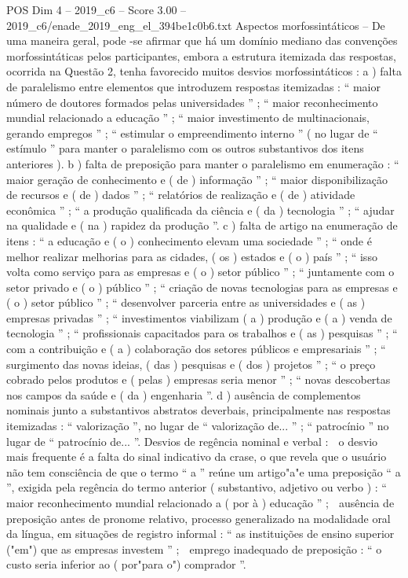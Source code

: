 \begin{textsample}{POS Dim 4 – 2019\_c6 – Score 3.00 – 2019\_c6/enade\_2019\_eng\_el\_394be1c0b6.txt}
Aspectos morfossintáticos – De uma maneira geral, pode -se afirmar que há um domínio mediano das convenções morfossintáticas pelos participantes, embora a estrutura itemizada das respostas, ocorrida na Questão 2, tenha favorecido muitos desvios morfossintáticos : a ) falta de paralelismo entre elementos que introduzem respostas itemizadas : “ maior número de doutores formados pelas universidades ” ; “ maior reconhecimento mundial relacionado a educação ” ; “ maior investimento de multinacionais, gerando empregos ” ; “ estimular o empreendimento interno ” ( no lugar de “ estímulo ” para manter o paralelismo com os outros substantivos dos itens anteriores ). b ) falta de preposição para manter o paralelismo em enumeração : “ maior geração de conhecimento e ( de ) informação ” ; “ maior disponibilização de recursos e ( de ) dados ” ; “ relatórios de realização e ( de ) atividade econômica ” ; “ a produção qualificada da ciência e ( da ) tecnologia ” ; “ ajudar na qualidade e ( na ) rapidez da produção ”. c ) falta de artigo na enumeração de itens : “ a educação e ( o ) conhecimento elevam uma sociedade ” ; “ onde é melhor realizar melhorias para as cidades, ( os ) estados e ( o ) país ” ; “ isso volta como serviço para as empresas e ( o ) setor público ” ; “ juntamente com o setor privado e ( o ) público ” ; “ criação de novas tecnologias para as empresas e ( o ) setor público ” ; “ desenvolver parceria entre as universidades e ( as ) empresas privadas ” ; “ investimentos viabilizam ( a ) produção e ( a ) venda de tecnologia ” ; “ profissionais capacitados para os trabalhos e ( as ) pesquisas ” ; “ com a contribuição e ( a ) colaboração dos setores públicos e empresariais ” ; “ surgimento das novas ideias, ( das ) pesquisas e ( dos ) projetos ” ; “ o preço cobrado pelos produtos e ( pelas ) empresas seria menor ” ; “ novas descobertas nos campos da saúde e ( da ) engenharia ”. d ) ausência de complementos nominais junto a substantivos abstratos deverbais, principalmente nas respostas itemizadas : “ valorização ”, no lugar de “ valorização de... ” ; “ patrocínio ” no lugar de “ patrocínio de... ”.
Desvios de regência nominal e verbal :  o desvio mais frequente é a falta do sinal indicativo da crase, o que revela que o usuário não tem consciência de que o termo “ a ” reúne um artigo"a"e uma preposição “ a ”, exigida pela regência do termo anterior ( substantivo, adjetivo ou verbo ) : “ maior reconhecimento mundial relacionado a ( por à ) educação ” ;  ausência de preposição antes de pronome relativo, processo generalizado na modalidade oral da língua, em situações de registro informal : “ as instituições de ensino superior ("em") que as empresas investem ” ;  emprego inadequado de preposição : “ o custo seria inferior ao ( por"para o") comprador ”.

\end{textsample}
